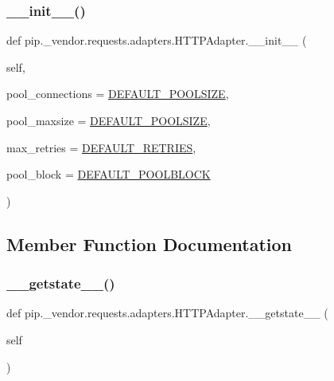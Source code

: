 \subsubsection{\texorpdfstring{\+\_\+\+\_\+init\+\_\+\+\_\+()}{\_\_init\_\_()}}
{\footnotesize\ttfamily def pip.\+\_\+vendor.\+requests.\+adapters.\+H\+T\+T\+P\+Adapter.\+\_\+\+\_\+init\+\_\+\+\_\+ (\begin{DoxyParamCaption}\item[{}]{self,  }\item[{}]{pool\+\_\+connections = {\ttfamily \hyperlink{namespacepip_1_1__vendor_1_1requests_1_1adapters_af8e5fcb6cae7c37dd1f744e907414583}{D\+E\+F\+A\+U\+L\+T\+\_\+\+P\+O\+O\+L\+S\+I\+ZE}},  }\item[{}]{pool\+\_\+maxsize = {\ttfamily \hyperlink{namespacepip_1_1__vendor_1_1requests_1_1adapters_af8e5fcb6cae7c37dd1f744e907414583}{D\+E\+F\+A\+U\+L\+T\+\_\+\+P\+O\+O\+L\+S\+I\+ZE}},  }\item[{}]{max\+\_\+retries = {\ttfamily \hyperlink{namespacepip_1_1__vendor_1_1requests_1_1adapters_a1dc93197b7ccf57f9152a304c699a8e0}{D\+E\+F\+A\+U\+L\+T\+\_\+\+R\+E\+T\+R\+I\+ES}},  }\item[{}]{pool\+\_\+block = {\ttfamily \hyperlink{namespacepip_1_1__vendor_1_1requests_1_1adapters_a1a319251a1ddc3b53aa48239822097c1}{D\+E\+F\+A\+U\+L\+T\+\_\+\+P\+O\+O\+L\+B\+L\+O\+CK}} }\end{DoxyParamCaption})}



\subsection{Member Function Documentation}
\mbox{\label{classpip_1_1__vendor_1_1requests_1_1adapters_1_1HTTPAdapter_a057fa65ea33c3fef74898e4cd54e715c}} 
\subsubsection{\texorpdfstring{\+\_\+\+\_\+getstate\+\_\+\+\_\+()}{\_\_getstate\_\_()}}
{\footnotesize\ttfamily def pip.\+\_\+vendor.\+requests.\+adapters.\+H\+T\+T\+P\+Adapter.\+\_\+\+\_\+getstate\+\_\+\+\_\+ (\begin{DoxyParamCaption}\item[{}]{self }\end{DoxyParamCaption})}


